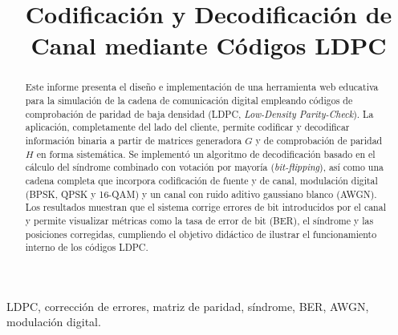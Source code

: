 \documentclass[conference]{IEEEtran}
\begin{document}
\title{Codificación y Decodificación de Canal mediante Códigos LDPC}

\author{
\and
{}
\and
{}
}

\maketitle

\begin{abstract}
Este informe presenta el diseño e implementación de una herramienta web educativa para la simulación de la cadena de comunicación digital empleando códigos de comprobación de paridad de baja densidad (LDPC, \emph{Low-Density Parity-Check}). La aplicación, completamente del lado del cliente, permite codificar y decodificar información binaria a partir de matrices generadora $G$ y de comprobación de paridad $H$ en forma sistemática. Se implementó un algoritmo de decodificación basado en el cálculo del síndrome combinado con votación por mayoría (\emph{bit-flipping}), así como una cadena completa que incorpora codificación de fuente y de canal, modulación digital (BPSK, QPSK y 16-QAM) y un canal con ruido aditivo gaussiano blanco (AWGN). Los resultados muestran que el sistema corrige errores de bit introducidos por el canal y permite visualizar métricas como la tasa de error de bit (BER), el síndrome y las posiciones corregidas, cumpliendo el objetivo didáctico de ilustrar el funcionamiento interno de los códigos LDPC.
\end{abstract}

\begin{IEEEkeywords}
LDPC, corrección de errores, matriz de paridad, síndrome, BER, AWGN, modulación digital.
\end{IEEEkeywords}
\end{document}
